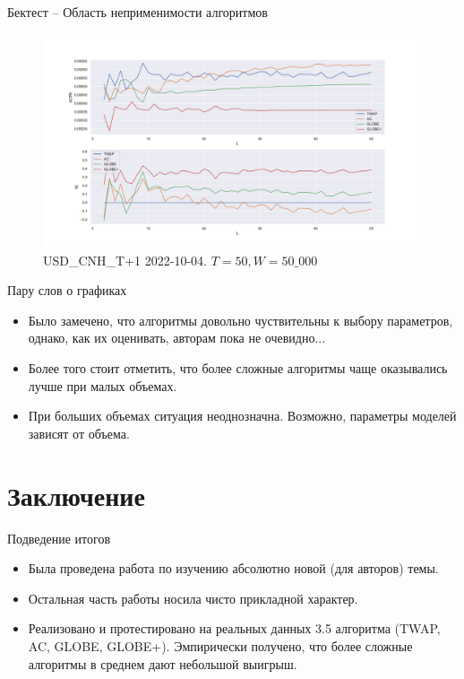 \documentclass[aspectratio=169]{beamer}
\begin{document}
        \begin{frame}{Бектест -- Область неприменимости алгоритмов}

            \begin{figure}  
                \centering
                \includegraphics[width=0.83\linewidth]{USD_CNH_T+1 2022-10-04 T = 50 W = 500 x1000}
                \caption{USD\_CNH\_T+1 2022-10-04. $T = 50, W = 50\_000$}
            \end{figure}
            
        \end{frame}


        \begin{frame}{Пару слов о графиках}
            \begin{itemize}
                \item Было замечено, что алгоритмы довольно чуствительны к выбору параметров, однако, как их оценивать, авторам пока не очевидно...

                \item Более того стоит отметить, что более сложные алгоритмы чаще оказывались лучше при малых объемах. 
    
                \item При больших объемах ситуация неоднозначна. Возможно, параметры моделей зависят от объема. 
            \end{itemize}
        \end{frame}

    \section{Заключение}

        \begin{frame}{Подведение итогов}
            \begin{itemize}
                \item Была проведена работа по изучению абсолютно новой (для авторов) темы. 
                \item Остальная часть работы носила чисто прикладной характер.
                \item Реализовано и протестировано на реальных данных 3.5 алгоритма (TWAP, AC, GLOBE, GLOBE+). Эмпирически получено, что более сложные алгоритмы в среднем дают небольшой выигрыш.             
            \end{itemize}
        \end{frame}
\end{document}
